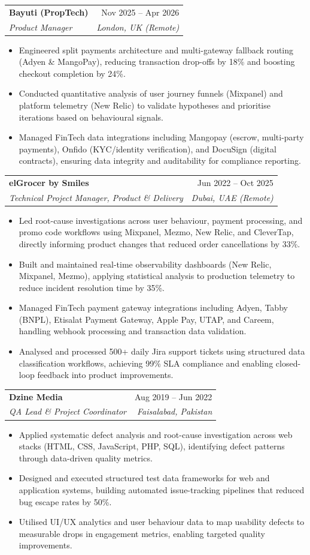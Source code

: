 \documentclass[letterpaper,10pt]{article}
\makeatletter
\newcommand{\resumeItem}[1]{
  \item\small{
    {#1 \vspace{-2pt}}
  }
}
\newcommand{\resumeSubheading}[4]{
  \vspace{-2pt}\item
    \begin{tabular*}{0.97\textwidth}[t]{l@{\extracolsep{\fill}}r}
      \textbf{#1} & #2 \\
      \textit{\small#3} & \textit{\small #4} \\
    \end{tabular*}\vspace{-7pt}
}
\newcommand{\resumeItemListStart}{\begin{itemize}[leftmargin=0.15in]}
\newcommand{\resumeItemListEnd}{\end{itemize}\vspace{-5pt}}
\makeatother
\begin{document}
    \resumeSubheading
      {Bayuti (PropTech)}{Nov 2025 – Apr 2026}
      {Product Manager}{London, UK (Remote)}
      \resumeItemListStart
        \resumeItem{Engineered split payments architecture and multi-gateway fallback routing (Adyen \& MangoPay), reducing transaction drop-offs by 18\% and boosting checkout completion by 24\%.}
        \resumeItem{Conducted quantitative analysis of user journey funnels (Mixpanel) and platform telemetry (New Relic) to validate hypotheses and prioritise iterations based on behavioural signals.}
        \resumeItem{Managed FinTech data integrations including Mangopay (escrow, multi-party payments), Onfido (KYC/identity verification), and DocuSign (digital contracts), ensuring data integrity and auditability for compliance reporting.}
      \resumeItemListEnd

    \resumeSubheading
      {elGrocer by Smiles}{Jun 2022 – Oct 2025}
      {Technical Project Manager, Product \& Delivery}{Dubai, UAE (Remote)}
      \resumeItemListStart
        \resumeItem{Led root-cause investigations across user behaviour, payment processing, and promo code workflows using Mixpanel, Mezmo, New Relic, and CleverTap, directly informing product changes that reduced order cancellations by 33\%.}
        \resumeItem{Built and maintained real-time observability dashboards (New Relic, Mixpanel, Mezmo), applying statistical analysis to production telemetry to reduce incident resolution time by 35\%.}
        \resumeItem{Managed FinTech payment gateway integrations including Adyen, Tabby (BNPL), Etisalat Payment Gateway, Apple Pay, UTAP, and Careem, handling webhook processing and transaction data validation.}
        \resumeItem{Analysed and processed 500+ daily Jira support tickets using structured data classification workflows, achieving 99\% SLA compliance and enabling closed-loop feedback into product improvements.}
      \resumeItemListEnd

    \resumeSubheading
      {Dzine Media}{Aug 2019 – Jun 2022}
      {QA Lead \& Project Coordinator}{Faisalabad, Pakistan}
      \resumeItemListStart
        \resumeItem{Applied systematic defect analysis and root-cause investigation across web stacks (HTML, CSS, JavaScript, PHP, SQL), identifying defect patterns through data-driven quality metrics.}
        \resumeItem{Designed and executed structured test data frameworks for web and application systems, building automated issue-tracking pipelines that reduced bug escape rates by 50\%.}
        \resumeItem{Utilised UI/UX analytics and user behaviour data to map usability defects to measurable drops in engagement metrics, enabling targeted quality improvements.}
      \resumeItemListEnd
\end{document}
